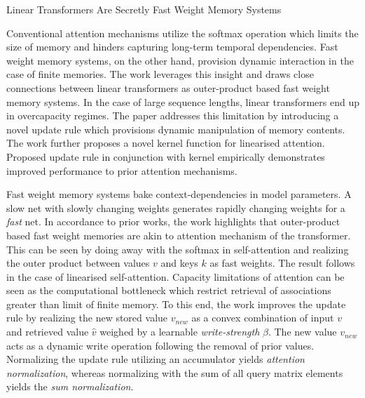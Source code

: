 \documentclass[11pt,letterpaper]{article}
\begin{document}
\begin{center}
  \large{Linear Transformers Are Secretly Fast Weight Memory Systems}
\end{center}

Conventional attention mechanisms utilize the softmax operation which limits the size of memory and hinders capturing long-term temporal dependencies. Fast weight memory systems, on the other hand, provision dynamic interaction in the case of finite memories. The work leverages this insight and draws close connections between linear transformers as outer-product based fast weight memory systems. In the case of large sequence lengths, linear transformers end up in overcapacity regimes. The paper addresses this limitation by introducing a novel update rule which provisions dynamic manipulation of memory contents. The work further proposes a novel kernel function for linearised attention. Proposed update rule in conjunction with kernel empirically demonstrates improved performance to prior attention mechanisms. 

Fast weight memory systems bake context-dependencies in model parameters. A slow net with slowly changing weights generates rapidly changing weights for a \textit{fast} net. In accordance to prior works, the work highlights that outer-product based fast weight memories are akin to attention mechanism of the transformer. This can be seen by doing away with the softmax in self-attention and realizing the outer product between values $v$ and keys $k$ as fast weights. The result follows in the case of linearised self-attention. Capacity limitations of attention can be seen as the computational bottleneck which restrict retrieval of associations greater than limit of finite memory. To this end, the work improves the update rule by realizing the new stored value $v_{new}$ as a convex combination of input $v$ and retrieved value $\hat{v}$ weighed by a learnable \textit{write-strength} $\beta$. The new value $v_{new}$ acts as a dynamic write operation following the removal of prior values. Normalizing the update rule utilizing an accumulator yields \textit{attention normalization}, whereas normalizing with the sum of all query matrix elements yields the \textit{sum normalization}. 
\end{document}
